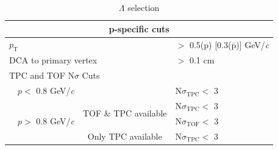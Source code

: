 \documentclass[ALICE,manyauthors]{cernphprep}
\newcommand{\Lam}{$\Lambda$\xspace}
\begin{document}
\begin{table}[htbp]
\begin{tabular}{lc|c|l}
   
   \multicolumn{4}{c}{\textbf{p-specific cuts}} \\
   \hline
   \multicolumn{3}{l|}{$p_{\mathrm{T}}$} & $ > $ 0.5(p) [0.3($\bar{\mathrm{p}}$)] GeV/\textit{c} \\
   \hline
   \multicolumn{3}{l|}{DCA to primary vertex} & $>$ 0.1 cm \\
   \hline
   \multicolumn{4}{l}{TPC and TOF N$\sigma$ Cuts} \\
   \cline{2-4}
    & \multicolumn{1}{c}{$p <$ 0.8 GeV/\textit{c}} & & N$\sigma_{\mathrm{TPC}} <$ 3 \\
   \cline{2-4}
    & \multicolumn{1}{c}{\multirow{3}{*}{$p >$ 0.8 GeV/\textit{c}}} &  \multirow{2}{*}{TOF \& TPC available} & N$\sigma_{\mathrm{TPC}} <$ 3 \\
    & \multicolumn{2}{c|}{} & N$\sigma_{\mathrm{TOF}} <$ 3 \\
   \cline{3-4}
    & \multicolumn{1}{c}{} & Only TPC available & N$\sigma_{\mathrm{TPC}} <$ 3 \\
   \hline   
  \end{tabular}
 \caption{\Lam selection}
 \label{tab:LamCuts} 
\end{table}
\end{document}
